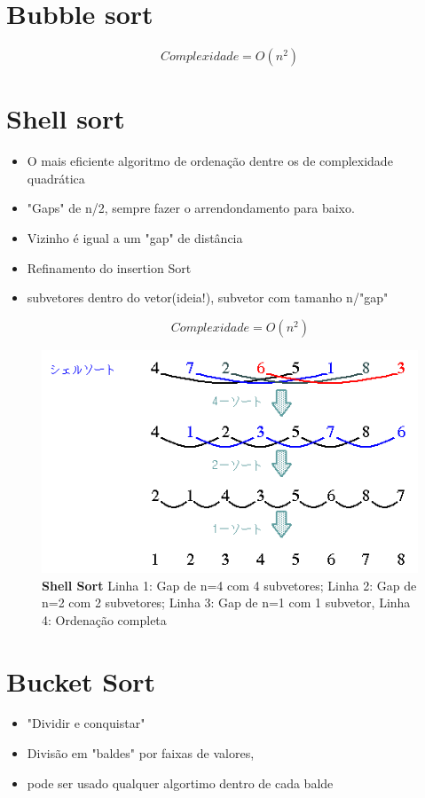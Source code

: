 \documentclass{article}
\begin{document}
\section{Bubble sort}
	\begin{equation}
		Complexidade= O(n^{2})
	\end{equation}
	
\section{Shell sort}

	\begin{itemize}
	\item O mais eficiente algoritmo de ordenação dentre os de complexidade quadrática
	\item "Gaps" de n/2, sempre fazer o arrendondamento para baixo.
	\item Vizinho é igual a um "gap" de distância
	\item Refinamento do insertion Sort
	\item subvetores dentro do vetor(ideia!), subvetor com tamanho n/"gap"		
	
		\begin{equation}
			Complexidade= O(n^{2})
		\end{equation}

	\end{itemize}
	\begin{figure}
		\centering
		\includegraphics[trim = 35mm 2mm 2mm 2mm,clip]{shell-sort.png}
		\caption{\textbf{Shell Sort} Linha 1: Gap de n=4 com 4 subvetores; Linha 2: Gap de n=2 com 2 subvetores; Linha 3: Gap de n=1 com 1 subvetor, Linha 4: Ordenação completa}
	\end{figure}
	
	
	
\section{Bucket Sort}
	\begin{itemize}
	\item "Dividir e conquistar"
	\item Divisão em "baldes" por faixas de valores,
	\item pode ser usado qualquer algortimo dentro de cada balde
	\end{itemize}
	
\end{document}
